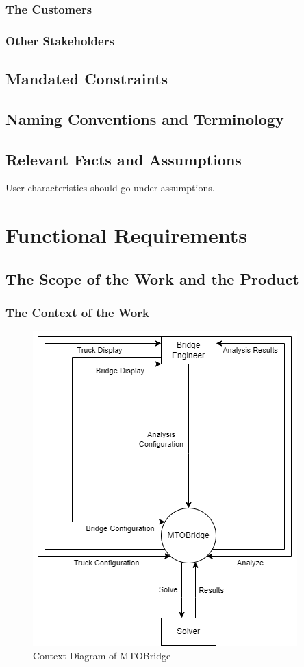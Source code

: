 \documentclass[12pt]{article}
\begin{document}
\subsubsection{The Customers}

\subsubsection{Other Stakeholders}

\subsection{Mandated Constraints}

\subsection{Naming Conventions and Terminology}

\subsection{Relevant Facts and Assumptions}

User characteristics should go under assumptions.

\section{Functional Requirements}

\subsection{The Scope of the Work and the Product}

\subsubsection{The Context of the Work}

\begin{figure}[H]
  \includegraphics[]{context-diagram.png}
  \caption{Context Diagram of MTOBridge}
  \label {fig:context-diagram}
\end{figure}
\end{document}
